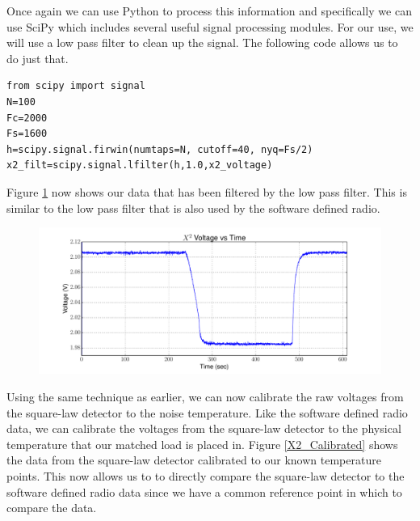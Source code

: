 Once again we can use Python to process this information and specifically we can use SciPy which includes several useful signal processing modules.  For our use, we will use a low pass filter to clean up the signal.  The following code allows us to do just that.

\begin{lstlisting}[frame=single,keywordstyle=\color{blue}]
from scipy import signal
N=100
Fc=2000
Fs=1600
h=scipy.signal.firwin(numtaps=N, cutoff=40, nyq=Fs/2)
x2_filt=scipy.signal.lfilter(h,1.0,x2_voltage)
\end{lstlisting}

Figure \ref{X2_filter} now shows our data that has been filtered by the low pass filter.  This is similar to the low pass filter that is also used by the software defined radio.

\begin{figure}[h!tb] \centering

\includegraphics[width=\textwidth]{Experiments/Exp1/x2_filter.pdf}

\label{X2_filter}
\end{figure}

Using the same technique as earlier, we can now calibrate the raw voltages from the square-law detector to the noise temperature.  Like the software defined radio data, we can calibrate the voltages from the square-law detector to the physical temperature that our matched load is placed in.  Figure \ref{X2_Calibrated} shows the data from the square-law detector calibrated to our known temperature points.  This now allows us to to directly compare the square-law detector to the software defined radio data since we have a common reference point in which to compare the data.

